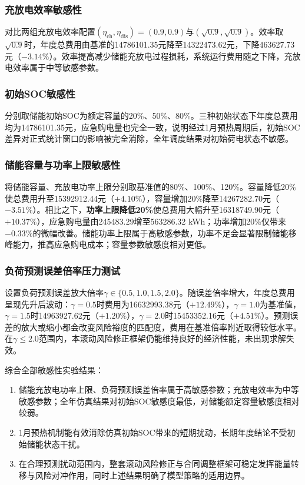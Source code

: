 \subsubsection{充放电效率敏感性}
对比两组充放电效率配置$(\eta_\mathrm{ch},\eta_\mathrm{dis})=(0.9,0.9)$与$(\sqrt{0.9},\sqrt{0.9})$。效率取$\sqrt{0.9}$时，年度总费用由基准的14786101.35元降至14322473.62元，下降463627.73元（$-3.14\%$）。效率提高减少储能充放电过程损耗，系统运行费用随之下降，充放电效率属于中等敏感参数。

\subsubsection{初始SOC敏感性}
分别取储能初始SOC为额定容量的20\%、50\%、80\%。三种初始状态下年度总费用均为14786101.35元，应急购电量也完全一致，说明经过1月预热周期后，初始SOC差异对正式统计窗口的影响被完全消除，全年调度结果对初始荷电状态不敏感。

\subsubsection{储能容量与功率上限敏感性}
将储能容量、充放电功率上限分别取基准值的80\%、100\%、120\%。容量降低20\%使总费用升至15392912.44元（$+4.10\%$），容量增加20\%降至14267282.70元（$-3.51\%$）。相比之下，\textbf{功率上限降低20\%}使总费用大幅升至16318749.90元（$+10.37\%$），应急购电量由245483.29增至563286.32 kWh；功率增加20\%仅带来$-0.33\%$的微幅改善。储能功率上限属于高敏感参数，功率不足会显著限制储能移峰能力，推高应急购电成本；容量参数敏感度相对更低。

\subsubsection{负荷预测误差倍率压力测试}
设置负荷预测误差放大倍率$\gamma\in\{0.5,1.0,1.5,2.0\}$。随误差倍率增大，年度总费用呈现先升后波动：$\gamma=0.5$时费用为16632993.38元（$+12.49\%$），$\gamma=1.0$为基准值，$\gamma=1.5$时14963927.62元（$+1.20\%$），$\gamma=2.0$时15453352.16元（$+4.51\%$）。预测误差的放大或缩小都会改变风险裕度的匹配度，费用在基准倍率附近取得较低水平。在$\gamma\le2.0$范围内，本滚动风险修正框架仍能维持良好的经济性能，未出现求解失效。

综合全部敏感性实验结果：
\begin{enumerate}
    \item 储能充放电功率上限、负荷预测误差倍率属于高敏感参数；充放电效率为中等敏感参数；全年仿真结果对初始SOC敏感度最低，对储能额定容量敏感度相对较弱。
    \item 1月预热机制能有效消除仿真初始SOC带来的短期扰动，长期年度结论不受初始储能状态干扰。
    \item 在合理预测扰动范围内，整套滚动风险修正与合同调整框架可稳定发挥能量转移与风险对冲作用，同时上述结果明确了模型策略的适用边界。
\end{enumerate}

